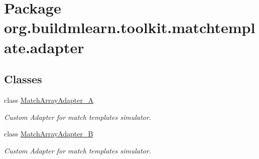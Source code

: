 \hypertarget{namespaceorg_1_1buildmlearn_1_1toolkit_1_1matchtemplate_1_1adapter}{}\section{Package org.\+buildmlearn.\+toolkit.\+matchtemplate.\+adapter}
\label{namespaceorg_1_1buildmlearn_1_1toolkit_1_1matchtemplate_1_1adapter}
\subsection*{Classes}
\begin{DoxyCompactItemize}
\item 
class \hyperlink{classorg_1_1buildmlearn_1_1toolkit_1_1matchtemplate_1_1adapter_1_1MatchArrayAdapter__A}{Match\+Array\+Adapter\+\_\+A}
\begin{DoxyCompactList}\small\item\em Custom Adapter for match template\textquotesingle{}s simulator. \end{DoxyCompactList}\item 
class \hyperlink{classorg_1_1buildmlearn_1_1toolkit_1_1matchtemplate_1_1adapter_1_1MatchArrayAdapter__B}{Match\+Array\+Adapter\+\_\+B}
\begin{DoxyCompactList}\small\item\em Custom Adapter for match template\textquotesingle{}s simulator. \end{DoxyCompactList}\end{DoxyCompactItemize}
